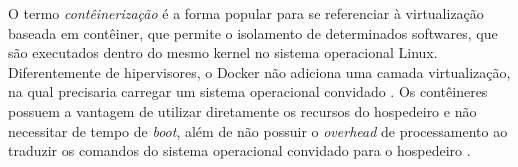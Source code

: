 \documentclass[twoside,english,brazilian]{UNISINOSartigo}
\begin{document}
O termo \textit{contêinerização} é a forma popular para se referenciar à virtualização baseada em contêiner, que permite o isolamento de determinados softwares, que são executados dentro do mesmo kernel no sistema operacional Linux. Diferentemente de hipervisores, o Docker não adiciona uma camada virtualização, na qual precisaria carregar um sistema operacional convidado \cite{Zhang2016}. Os contêineres possuem a vantagem de utilizar diretamente os recursos do hospedeiro e não necessitar de tempo de \textit{boot}, além de não possuir o \textit{overhead} de processamento ao traduzir os comandos do sistema operacional convidado para o hospedeiro \cite{Dua2014}.

\end{document}

